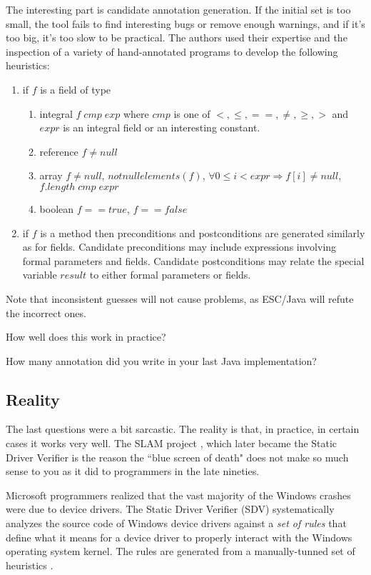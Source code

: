 \documentclass[12pt]{article}
\begin{document}
The interesting part is candidate annotation generation. If the initial set is too small, the tool fails to find interesting bugs or remove enough warnings, and if it's too big, it's too slow to be practical. 
The authors used their expertise and the inspection of a variety of hand-annotated programs to develop the following heuristics:
\begin{enumerate}
\item if $f$ is a field of type
\begin{enumerate}
\item integral $f \; cmp \; exp$  where $cmp$ is one of $<,\leq,==,\neq,\geq, >$ and $expr$ is an integral field or an interesting constant.
\item reference $f \neq null$
\item array $f \neq null$, $notnullelements(f)$, $\forall 0 \leq i < expr \Rightarrow f[i] \neq null$, $f.length\; cmp \; expr$
\item boolean $f == true$, $f == false$
\end{enumerate}
\item if $f$ is a method then preconditions and postconditions are generated similarly as for fields. Candidate preconditions may include expressions involving formal parameters and fields. Candidate postconditions may relate the special variable $result$ to either formal parameters or fields.   
\end{enumerate}

Note that inconsistent guesses will not cause problems, as ESC/Java will refute the incorrect ones.

How well does this work in practice? 

How many annotation did you write in your last Java implementation?

\subsection{Reality}
The last questions were a bit sarcastic. The reality is that, in practice, in certain cases it works very well. The SLAM project \cite{slam}, which later became the Static Driver Verifier \cite{SDV} is the reason the ``blue screen of death" does not make so much sense to you as it did to programmers in the late nineties. 

Microsoft programmers realized that the vast majority of the Windows crashes were due to device drivers. The Static Driver Verifier (SDV) \cite{slam-SDV} systematically analyzes the source code of Windows device drivers against a \textit{set of rules} that define what it means for a device driver to properly interact with the Windows operating system kernel. The rules are generated from a manually-tunned set of heuristics \cite{paper}.
\end{document}
